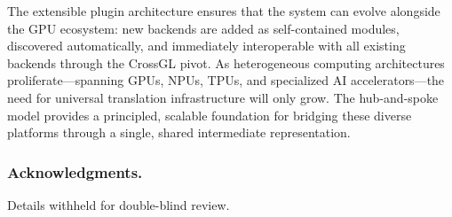 \documentclass{svproc}
\begin{document}
The extensible plugin architecture ensures that the system can evolve alongside the GPU ecosystem: new backends are added as self-contained modules, discovered automatically, and immediately interoperable with all existing backends through the CrossGL pivot. As heterogeneous computing architectures proliferate---spanning GPUs, NPUs, TPUs, and specialized AI accelerators---the need for universal translation infrastructure will only grow. The hub-and-spoke model provides a principled, scalable foundation for bridging these diverse platforms through a single, shared intermediate representation.

\subsubsection{Acknowledgments.} Details withheld for double-blind review.
\end{document}
